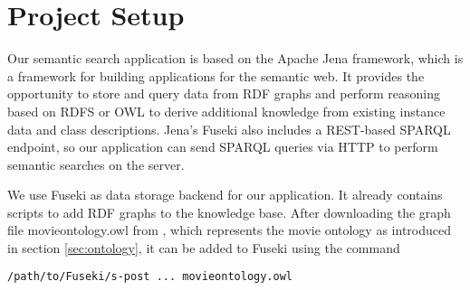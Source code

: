\section{Project Setup}
Our semantic search application is based on the Apache Jena framework, which is a framework for building applications for the semantic web. %
It provides the opportunity to store and query data from RDF graphs and perform reasoning based on RDFS or OWL to derive additional knowledge from existing instance data and class descriptions. Jena's Fuseki also includes a REST-based SPARQL endpoint, so our application can send SPARQL queries via HTTP to perform semantic searches on the server.







We use Fuseki as data storage backend for our application. It already contains scripts to add RDF graphs to the knowledge base. After downloading the graph file movieontology.owl from \cite{bouza:movieontology}, which represents the movie ontology as introduced in section \ref{sec:ontology}, it can be added to Fuseki using the command
\begin{lstlisting}[language=bash]
/path/to/Fuseki/s-post ... movieontology.owl
\end{lstlisting}

